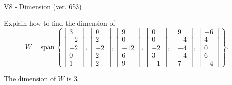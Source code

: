 \begin{exercise}
  \begin{exerciseTitle}V8 - Dimension (ver. 653)\end{exerciseTitle}
  \begin{exerciseStatement}
    Explain how to find the dimension of 
\[W=\mathrm{span}\ \left\{\left[\begin{array}{r}
3 \\
-2 \\
-2 \\
0 \\
1
\end{array}\right] , \left[\begin{array}{r}
0 \\
2 \\
-2 \\
2 \\
2
\end{array}\right] , \left[\begin{array}{r}
9 \\
0 \\
-12 \\
6 \\
9
\end{array}\right] , \left[\begin{array}{r}
0 \\
0 \\
-2 \\
3 \\
-1
\end{array}\right] , \left[\begin{array}{r}
9 \\
-4 \\
-4 \\
-4 \\
7
\end{array}\right] , \left[\begin{array}{r}
-6 \\
4 \\
0 \\
6 \\
-4
\end{array}\right]\right\}.\]



  \end{exerciseStatement}
  \begin{exerciseAnswer}
   The dimension of \(W\) is  \(3\).
  


  \end{exerciseAnswer}
\end{exercise}